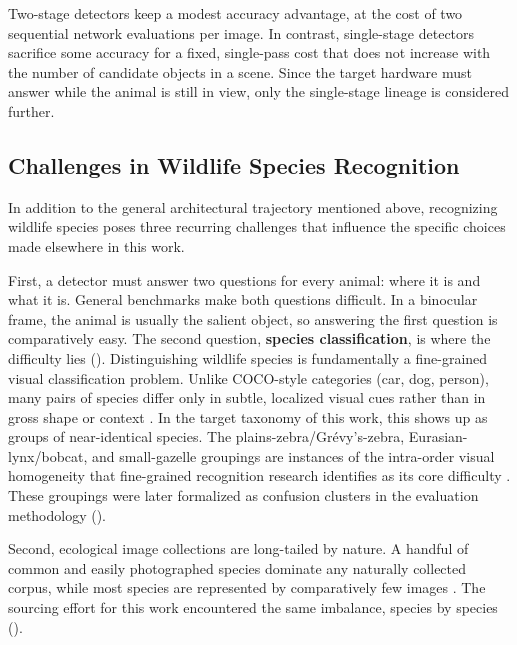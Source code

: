 Two-stage detectors keep a modest accuracy advantage, at the cost of two sequential network evaluations per image. In contrast, single-stage detectors sacrifice some accuracy for a fixed, single-pass cost that does not increase with the number of candidate objects in a scene. Since the target hardware must answer while the animal is still in view, only the single-stage lineage is considered further.

\subsection{Challenges in Wildlife Species Recognition}\label{sec:lit_wildlife_challenges}

In addition to the general architectural trajectory mentioned above, recognizing wildlife species poses three recurring challenges that influence the specific choices made elsewhere in this work.

First, a detector must answer two questions for every animal: where it is and what it is. General benchmarks make both questions difficult. In a binocular frame, the animal is usually the salient object, so answering the first question is comparatively easy. The second question, \textbf{species classification}, is where the difficulty lies (). Distinguishing wildlife species is fundamentally a fine-grained visual classification problem. Unlike COCO-style categories (car, dog, person), many pairs of species differ only in subtle, localized visual cues rather than in gross shape or context \cite{weiFineGrainedImageAnalysis2022}. In the target taxonomy of this work, this shows up as groups of near-identical species. The plains-zebra/Grévy's-zebra, Eurasian-lynx/bobcat, and small-gazelle groupings are instances of the intra-order visual homogeneity that fine-grained recognition research identifies as its core difficulty \cite{weiFineGrainedImageAnalysis2022}. These groupings were later formalized as confusion clusters in the evaluation methodology ().

Second, ecological image collections are long-tailed by nature. A handful of common and easily photographed species dominate any naturally collected corpus, while most species are represented by comparatively few images \cite{cuiClassBalancedLossBased2019,zhangDeepLongTailedLearning2023}. The sourcing effort for this work encountered the same imbalance, species by species ().

